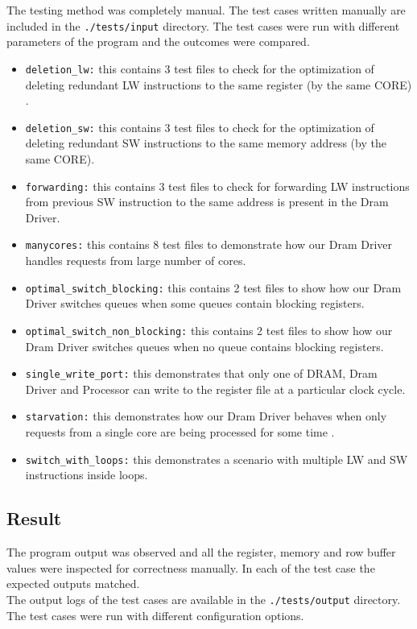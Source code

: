 \documentclass[hidelinks,12pt]{article}
\begin{document}
The testing method was completely manual. The test cases written manually are included in the \verb|./tests/input| directory. The test cases were run with different parameters
of the program and the outcomes were compared.
\begin{itemize}
    \item \verb|deletion_lw:| this contains 3 test files to check for the optimization of deleting redundant LW instructions to the same register (by the same CORE) .
    \item \verb|deletion_sw:| this contains 3 test files to check for the optimization of deleting redundant SW instructions to the same memory address (by the same CORE).
    \item \verb|forwarding:| this contains 3 test files to check for forwarding LW instructions from previous SW instruction to the same address is present in the Dram Driver.
    \item \verb|manycores:| this contains 8 test files to demonstrate how our Dram Driver handles requests from large number of cores.
    \item \verb|optimal_switch_blocking:| this contains 2 test files to show how our Dram Driver switches queues when some queues contain blocking registers.
    \item \verb|optimal_switch_non_blocking:| this contains 2 test files to show how our Dram Driver switches queues when no queue contains blocking registers.
    \item \verb|single_write_port:| this demonstrates that only one of DRAM, Dram Driver and Processor can write to the register file at a particular clock cycle.
    \item \verb|starvation:| this demonstrates how our Dram Driver behaves when only requests from a single core are being processed for some time  .
    \item \verb|switch_with_loops:| this demonstrates a scenario with multiple LW and SW instructions inside loops.
\end{itemize}

\subsection{Result}
The program output was observed and all the register, memory and row buffer values were inspected for correctness manually. In each of the test case the expected outputs matched.\\[0.2cm]
The output logs of the test cases are available in the \verb|./tests/output| directory. The test cases were run with different configuration options.
\end{document}
